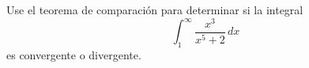 \item Use el teorema de comparación para determinar si la integral
    \[ \int_{1}^{\infty} \frac{x^3}{x^5 + 2} \, dx \]
    es convergente o divergente.
